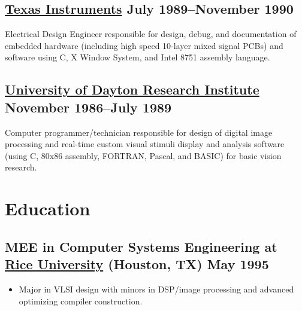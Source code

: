 \documentclass[10pt,letterpaper,oneside]{report}
\begin{document}
\medskip

\begin{minipage}{\textwidth}
  \subsection[Texas Instruments]{
    {\href{http://www.ti.com/}{Texas Instruments} \hfill July 1989--November 1990}
  }

  Electrical Design Engineer responsible for design, debug, and documentation of
  embedded hardware (including high speed 10-layer mixed signal PCBs) and
  software using C, X Window System, and Intel 8751 assembly language.
\end{minipage}

\medskip

\begin{minipage}{\textwidth}
  \subsection[University of Dayton Research Institute]{
    \href{http://www.udri.udayton.edu/AboutUDRI/}{University of Dayton Research
    Institute} \hfill November 1986--July 1989
  }

  Computer programmer/technician responsible for design of digital image
  processing and real-time custom visual stimuli display and analysis
  software (using C, 80x86 assembly, FORTRAN, Pascal, and BASIC) for basic
  vision research.
\end{minipage}

\section{Education}

\begin{minipage}{\textwidth}
  \subsection[MEE in Computer Systems Engineering]{
    MEE in Computer Systems Engineering at
    \href{http://www.ece.rice.edu/}{Rice University}
    {\small (Houston, TX)} \hfill May 1995
  }

  \begin{itemize}
    \item Major in VLSI design with minors in DSP/image processing and advanced
      optimizing compiler construction.
  \end{itemize}
\end{minipage}
\end{document}
